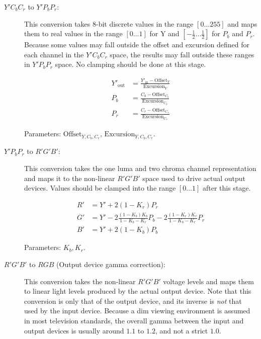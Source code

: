 \documentclass[11pt,letterpaper]{book}
\numberwithin{equation}{chapter}
\numberwithin{figure}{chapter}
\numberwithin{table}{chapter}
\begin{document}
\begin{description}
\item[$Y'C_bC_r$ to $Y'P_bP_r$:]
\vspace{\baselineskip}\hfill

This conversion takes 8-bit discrete values in the range $[0\ldots255]$ and
 maps them to real values in the range $[0\ldots1]$ for Y and
 $[-\frac{1}{2}\ldots\frac{1}{2}]$ for $P_b$ and $P_r$.
Because some values may fall outside the offset and excursion defined for each
 channel in the $Y'C_bC_r$ space, the results may fall outside these ranges in
 $Y'P_bP_r$ space.
No clamping should be done at this stage.

\begin{align}
Y'_\mathrm{out} & =
 \frac{Y'_\mathrm{in}-\mathrm{Offset}_Y}{\mathrm{Excursion}_Y} \\
P_b             & =
 \frac{C_b-\mathrm{Offset}_{C_b}}{\mathrm{Excursion}_{C_b}} \\
P_r             & =
 \frac{C_r-\mathrm{Offset}_{C_r}}{\mathrm{Excursion}_{C_r}}
\end{align}

Parameters: $\mathrm{Offset}_{Y,C_b,C_r}$, $\mathrm{Excursion}_{Y,C_b,C_r}$.

\item[$Y'P_bP_r$ to $R'G'B'$:]
\vspace{\baselineskip}\hfill

This conversion takes the one luma and two chroma channel representation and
 maps it to the non-linear $R'G'B'$ space used to drive actual output devices.
Values should be clamped into the range $[0\ldots1]$ after this stage.

\begin{align}
R' & = Y'+2(1-K_r)P_r \\
G' & = Y'-2\frac{(1-K_b)K_b}{1-K_b-K_r}P_b-2\frac{(1-K_r)K_r}{1-K_b-K_r}P_r\\
B' & = Y'+2(1-K_b)P_b
\end{align}

Parameters: $K_b,K_r$.

\item[$R'G'B'$ to $RGB$ (Output device gamma correction):]
\vspace{\baselineskip}\hfill

This conversion takes the non-linear $R'G'B'$ voltage levels and maps them to
 linear light levels produced by the actual output device.
Note that this conversion is only that of the output device, and its inverse is
 {\em not} that used by the input device.
Because a dim viewing environment is assumed in most television standards, the
 overall gamma between the input and output devices is usually around $1.1$ to
 $1.2$, and not a strict $1.0$.


\end{description}
\end{document}
